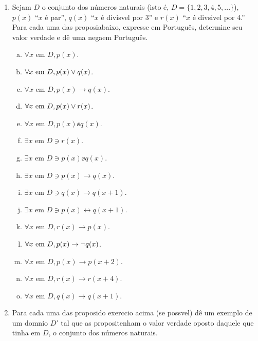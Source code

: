 \begin{enumerate}[{\bf 1.}]
\item Sejam $D$ o conjunto dos n\'umeros naturais (isto \'e, $D=\{1,2,3,4,5,...\}$), $p(x)$ ``$x$ \'e par'', $q(x)$ ``$x$ \'e divis\ih vel por $3$'' e $r(x)$ ``$x$ \'e div\ih sivel por $4$.'' Para cada uma das proposi\coes abaixo, expresse em Portugu\^es, determine seu valor verdade e d\^e uma nega\cao em Portugu\^es.  
\begin{enumerate}[a)]
\item $\forall x \textrm{ em } D, p(x)$.
\item $\forall x \textrm{ em } D, p(x)\vee q(x)$.
\item $\forall x \textrm{ em } D, p(x)\to q(x)$.
\item $\forall x \textrm{ em } D, p(x)\vee r(x)$.
\item $\forall x \textrm{ em } D, p(x)\ee q(x)$.
\item $\exists x \textrm{ em } D \ni r(x)$.
\item $\exists x \textrm{ em } D \ni p(x)\ee q(x)$.
\item $\exists x \textrm{ em } D \ni p(x)\to q(x)$.
\item $\exists x \textrm{ em } D \ni q(x)\to q(x+1)$.
\item $\exists x \textrm{ em } D \ni p(x) \leftrightarrow q(x+1)$.
\item $\forall x \textrm{ em } D, r(x)\to p(x)$.
\item $\forall x \textrm{ em } D, p(x)\to\lnot q(x)$.
\item $\forall x \textrm{ em } D, p(x)\to p(x+2)$.
\item $\forall x \textrm{ em } D, r(x)\to r(x+4)$.
\item $\forall x \textrm{ em } D, q(x)\to q(x+1)$.
\end{enumerate}

\item Para cada uma das proposi\coes do exerc\ih cio acima (se poss\ih vel) d\^e um exemplo de um dom\ih nio $D'$ tal que as proposi\coes tenham o valor verdade oposto daquele que tinha em $D$, o conjunto dos n\'umeros naturais.


\end{enumerate}

